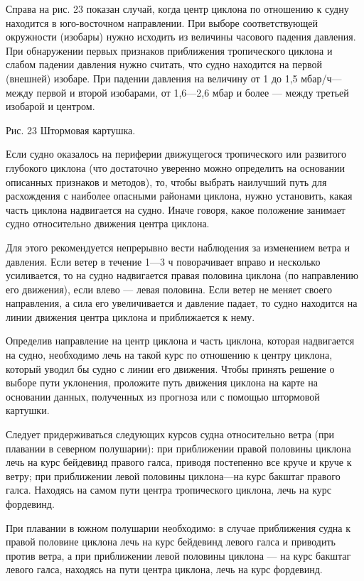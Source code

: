 Справа на рис. 23 показан случай, когда центр циклона по отношению к судну находится в юго-восточном направлении. При выборе соответствующей окружности (изобары) нужно исходить из величины часового падения давления. При обнаружении первых признаков приближения тропического циклона и слабом падении давления нужно считать, что судно находится на первой (внешней) изобаре. При падении давления на величину от 1 до 1,5 мбар/ч—между первой и второй изобарами, от 1,6—2,6 мбар и более — между третьей изобарой и центром.


Рис. 23 Штормовая картушка.

Если судно оказалось на периферии движущегося тропического или развитого глубокого циклона (что достаточно уверенно можно определить на основании описанных признаков и методов), то, чтобы выбрать наилучший путь для расхождения с наиболее опасными районами циклона, нужно установить, какая часть циклона надвигается на судно. Иначе говоря, какое положение занимает судно относительно движения центра циклона.

Для этого рекомендуется непрерывно вести наблюдения за изменением ветра и давления. Если ветер в течение 1—3 ч поворачивает вправо и несколько усиливается, то на судно надвигается правая половина циклона (по направлению его движения), если влево — левая половина. Если ветер не меняет своего направления, а сила его увеличивается и давление падает, то судно находится на линии движения центра циклона и приближается к нему.

Определив направление на центр циклона и часть циклона, которая надвигается на судно, необходимо лечь на такой курс по отношению к центру циклона, который уводил бы судно с линии его движения. Чтобы принять решение о выборе пути уклонения, проложите путь движения циклона на карте на основании данных, полученных из прогноза или с помощью штормовой картушки.

Следует придерживаться следующих курсов судна относительно ветра (при плавании в северном полушарии): при приближении правой половины циклона лечь на курс бейдевинд правого галса, приводя постепенно все круче и круче к ветру; при приближении левой половины циклона—на курс бакштаг правого галса. Находясь на самом пути центра тропического циклона, лечь на курс фордевинд.

При плавании в южном полушарии необходимо: в случае приближения судна к правой половине циклона лечь на курс бейдевинд левого галса и приводить против ветра, а при приближении левой половины циклона — на курс бакштаг левого галса, находясь на пути центра циклона, лечь на курс фордевинд.

